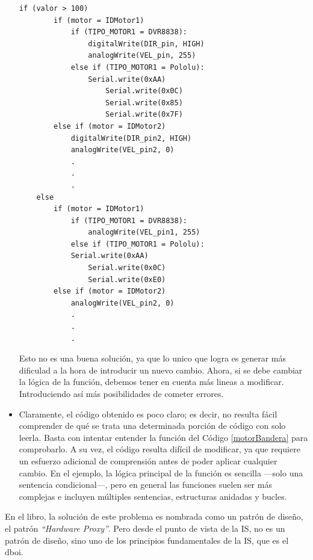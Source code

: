 \begin{itemize}
\begin{lstlisting}[caption=Modificación de la función controlar\_motor para utilizar bandera indicadora de tipo de placa controladora.,label={motorBandera}]
	if (valor > 100)
		if (motor = IDMotor1)
			if (TIPO_MOTOR1 = DVR8838):
			    digitalWrite(DIR_pin, HIGH)
	    		analogWrite(VEL_pin, 255)
			else if (TIPO_MOTOR1 = Pololu):
    			Serial.write(0xAA)
					Serial.write(0x0C)
					Serial.write(0x85)
					Serial.write(0x7F)
		else if (motor = IDMotor2)
	    	digitalWrite(DIR_pin2, HIGH)
	    	analogWrite(VEL_pin2, 0)
	    	.
	    	.
	    	.
	else
		if (motor = IDMotor1)
			if (TIPO_MOTOR1 = DVR8838):
				analogWrite(VEL_pin1, 255)
			else if (TIPO_MOTOR1 = Pololu):
	    	Serial.write(0xAA)
				Serial.write(0x0C)
				Serial.write(0xE0)
	    else if (motor = IDMotor2)
	    	analogWrite(VEL_pin2, 0)
	    	.
	    	.
	    	.

\end{lstlisting}

Esto no es una buena solución, ya que lo unico que logra es generar más dificulad a la hora de introducir un nuevo cambio. Ahora, si se debe cambiar la lógica de la función, debemos tener en cuenta más lineas a modificar. Introduciendo así más posibilidades de cometer errores.

    \item Claramente, el código obtenido es poco claro; es decir, no resulta fácil comprender de qué se trata una determinada porción de código con solo leerla. Basta con intentar entender la función del Código \ref{motorBandera} para comprobarlo. A su vez, el código resulta difícil de modificar, ya que requiere un esfuerzo adicional de comprensión antes de poder aplicar cualquier cambio. En el ejemplo, la lógica principal de la función es sencilla —solo una sentencia condicional—, pero en general las funciones suelen ser más complejas e incluyen múltiples sentencias, estructuras anidadas y bucles.


\end{itemize}

En el libro, la solución de este problema es nombrada como un patrón de diseño, el patrón \textit{``Hardware Proxy''}. Pero desde el punto de vista de la IS, no es un patrón de diseño, sino uno de los principios fundamentales de la  IS, que es el \gls{dboi}.


